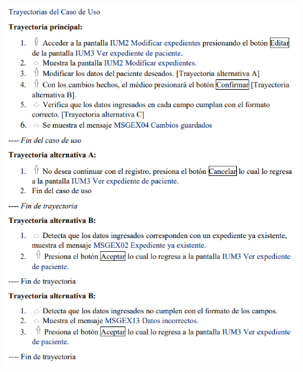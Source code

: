 \documentclass[12pt,letterpaper]{article}
\begin{document}
            \begin{figure}[H]
                \centering
                \includegraphics [scale=0.9]{specs/trayModificarExpediente}
            \end{figure}
\end{document}
